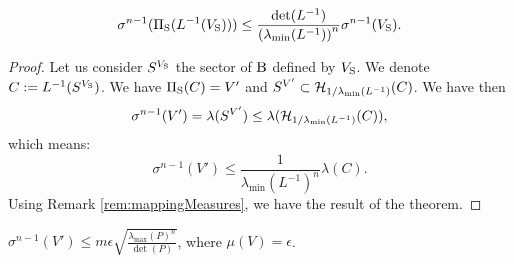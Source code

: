 \begin{theorem} \label{lemma:lip}
\begin{equation}
\sigma^{n-1}(\Pi_{\text{S}}(L^{-1}(V_{\text{S}}))) \leq \frac{\det(L^{-1})}{\left(\lambda_{\min}(L^{-1})\right)^n} \sigma^{n-1}(V_{\text{S}}).
\end{equation}   
\end{theorem}

\begin{proof}
Let us consider $S^{V_{\text{S}}}$ the sector of $\text{B}$ defined by $V_{\text{S}}$. We denote $C:= L^{-1}(S^{V_{\text{S}}})$. We have $\Pi_{\text{S}}(C) = V'$ and $S^{V'} \subset \mathcal{H}_{1/ \lambda_{\min}(L^{-1})}(C)$.  We have then 
$$\sigma^{n-1}(V') = \lambda(S^{V'}) \leq \lambda (\mathcal{H}_{1/ \lambda_{\min}(L^{-1})}(C)),$$ which means: $$\sigma^{n-1}(V') \leq \frac{1}{\lambda_{\min}(L^{-1})^n} \lambda(C).$$ Using Remark \ref{rem:mappingMeasures}, we have the result of the theorem.





\end{proof}

\begin{corollary}$\sigma^{n-1}(V') \leq m\epsilon \sqrt{\frac{\lambda_{\max}(P)^n}{\det(P)}}$,
where $\mu(V) = \epsilon$.
\end{corollary}



